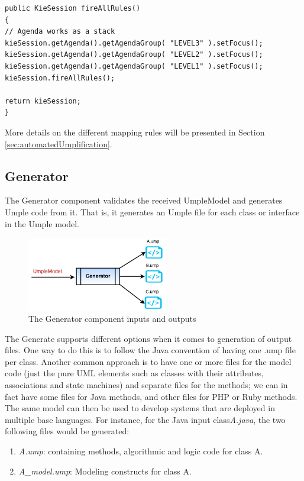 \begin{lstlisting}[style=java, caption=Firing the rules in the Umplificator, label=lst:fireAllRules]
public KieSession fireAllRules()
{
// Agenda works as a stack
kieSession.getAgenda().getAgendaGroup( "LEVEL3" ).setFocus();
kieSession.getAgenda().getAgendaGroup( "LEVEL2" ).setFocus();
kieSession.getAgenda().getAgendaGroup( "LEVEL1" ).setFocus();
kieSession.fireAllRules();

return kieSession;
}
\end{lstlisting}

More details on the different mapping rules will be presented in Section \ref{sec:automatedUmplification}.

\subsection{Generator}

The Generator component validates the received UmpleModel and generates Umple code from it. That is, it generates an Umple file for each class or interface in the Umple model.

\begin{figure}[h]
\centering
\includegraphics[width=0.55\textwidth]{Figures/generatorINOut.png}
\caption{The Generator component inputs and outputs}
\label{fig:generatorInOut}
\end{figure}

The Generate supports different options when it comes to generation of output files.  One way to do this is to follow the Java convention of having one .ump file per class. Another common approach is to have one or more files for the model code (just the pure UML elements such as classes with their attributes, associations and state machines) and separate files for the methods; we can in fact have some files for Java methods, and other files for PHP or Ruby methods. The same model can then be used to develop systems that are deployed in multiple base languages. For instance, for the Java  input class\textit{A.java}, the two following files would be generated:

\begin{enumerate}
\item \textit{A.ump}: containing methods, algorithmic and logic code for class A.
\item \textit{A\_model.ump}: Modeling constructs for class A.
\end{enumerate}

